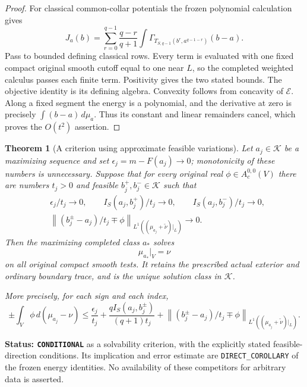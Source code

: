 \documentclass[11pt,a4paper]{article}
\numberwithin{equation}{section}
\newtheorem{theorem}{Theorem}[section]
\theoremstyle{definition}
\theoremstyle{remark}
\begin{document}
\begin{proof}
For classical common-collar potentials the frozen polynomial calculation
gives
\[
 J_a(b)=\sum_{r=0}^{q-1}\frac{q-r}{q+1}
       \int\Gamma_{T_{S,q-1}(b^r,a^{q-1-r})}(b-a).
\]
Pass to bounded defining classical rows. Every term is evaluated with
one fixed compact original smooth cutoff equal to one near $L$, so the
completed weighted calculus passes each finite term. Positivity gives
the two stated bounds. The objective identity is its defining algebra.
Convexity follows from concavity of $\mathcal E$. Along a fixed segment
the energy is a polynomial, and the derivative at zero is precisely
$\int(b-a)\,d\mu_a$. Thus its constant and linear remainders cancel,
which proves the $O(t^2)$ assertion.
\end{proof}

\begin{theorem}[A criterion using approximate feasible variations]
\label{thm:r6-approximate-variation-dirichlet}
Let $a_j\in\mathscr K$ be a maximizing sequence and set
$\epsilon_j=m-F(a_j)\to0$; monotonicity of these numbers is
unnecessary. Suppose that for every original real
$\phi\in A_c^{0,0}(V)$ there are numbers $t_j>0$ and feasible
$b_j^+,b_j^-\in\mathscr K$ such that
\begin{align}
 &\epsilon_j/t_j\longrightarrow0,
       \qquad I_S(a_j,b_j^+)/t_j\longrightarrow0,
       \qquad I_S(a_j,b_j^-)/t_j\longrightarrow0,
       \label{eq:r6-variation-cost-condition}\\
 &\left\|(b_j^\pm-a_j)/t_j\mp\phi\right\|_
                 {L^1((\mu_{a_j}+\widetilde\nu)|_L)}
                         \longrightarrow0.
       \label{eq:r6-variation-direction-condition}
\end{align}
Then the maximizing completed class $a_*$ solves
\[
                          \mu_{a_*}|_V=\nu
\]
on all original compact smooth tests. It retains the prescribed actual
exterior and ordinary boundary trace, and is the unique solution class
in $\mathscr K$.

More precisely, for each sign and each index,
\begin{equation}
 \pm\int_V\phi\,d(\mu_{a_j}-\nu)
 \le \frac{\epsilon_j}{t_j}
      +\frac{qI_S(a_j,b_j^\pm)}{(q+1)t_j}
      +\left\|(b_j^\pm-a_j)/t_j\mp\phi\right\|_
                    {L^1((\mu_{a_j}+\widetilde\nu)|_L)}.
 \label{eq:r6-approximate-variation-defect}
\end{equation}
\end{theorem}

\noindent\textbf{Status: \texttt{CONDITIONAL}} as a solvability
criterion, with the explicitly stated feasible-direction conditions.
Its implication and error estimate are \texttt{DIRECT\_COROLLARY} of
the frozen energy identities. No availability of these competitors for
arbitrary data is asserted.
\end{document}
